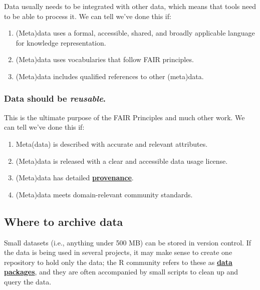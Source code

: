 \documentclass[
]{krantz}
\providecommand{\tightlist}{%
  \setlength{\itemsep}{0pt}\setlength{\parskip}{0pt}}
\newcommand{\gref}[2]{\hyperlink{#2}{\textbf{#1}}}
\begin{document}
Data usually needs to be integrated with other data,
which means that tools need to be able to process it.
We can tell we've done this if:

\begin{enumerate}
\def\labelenumi{\arabic{enumi}.}
\tightlist
\item
  (Meta)data uses a formal, accessible, shared, and broadly applicable language for knowledge representation.
\item
  (Meta)data uses vocabularies that follow FAIR principles.
\item
  (Meta)data includes qualified references to other (meta)data.
\end{enumerate}

\hypertarget{data-should-be-reusable.}{%
\subsubsection{\texorpdfstring{Data should be \emph{reusable}.}{Data should be reusable.}}\label{data-should-be-reusable.}}

This is the ultimate purpose of the FAIR Principles and much other work.
We can tell we've done this if:

\begin{enumerate}
\def\labelenumi{\arabic{enumi}.}
\tightlist
\item
  Meta(data) is described with accurate and relevant attributes.
\item
  (Meta)data is released with a clear and accessible data usage license.
\item
  (Meta)data has detailed \gref{provenance}{provenance}.
\item
  (Meta)data meets domain-relevant community standards.
\end{enumerate}

\hypertarget{provenance-data-where}{%
\subsection{Where to archive data}\label{provenance-data-where}}

Small datasets (i.e., anything under 500 MB) can be stored in version control.
If the data is being used in several projects,
it may make sense to create one repository to hold only the data;
the R community refers to these as \gref{data packages}{data\_package},
and they are often accompanied by small scripts to clean up and query the data.
\end{document}
